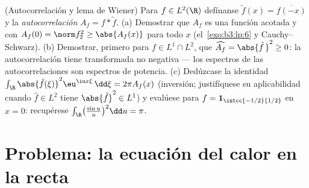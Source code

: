 \begin{exercise}[$\star\star$]\label{exo:b3:fouriertransform:12}
(Autocorrelación y lema de Wiener) Para $f \in L^2(\R)$ defínanse
$\tilde f(x) = \overline{f(-x)}$ y la \emph{autocorrelación}
$A_f = f * \tilde f$. (a) Demostrar que $A_f$ es una función acotada y
 con
$A_f(0) = \norm f_2^2 \geq \abs{A_f(x)}$ para todo $x$
(el~\cref{exo:b3:lp:6} y Cauchy--Schwarz). (b) Demostrar, primero para
$f \in L^1\cap L^2$, que $\widehat{A_f} = \abs{\hat f\,}^2 \geq 0$: la
autocorrelación tiene transformada no negativa --- los espectros de las
autocorrelaciones son espectros de potencia. (c) Dedúzcase la identidad
$\int_\R\abs{\hat
f(\xi)}^2\eu^{\iu x\xi}\,\dd\xi = 2\pi A_f(x)$ (inversión; justifíquese
su aplicabilidad cuando $\hat f \in L^2$ tiene $\abs{\hat f}^2 \in L^1$)
y evalúese para $f = \mathbf
1_{\intcc{-1/2}{1/2}}$ en $x = 0$: recupérese
$\int_\R\bigl(\frac{\sin u}u\bigr)^2\dd u = \pi$.
\end{exercise}

\section{Problema: la ecuación del calor en la recta}

